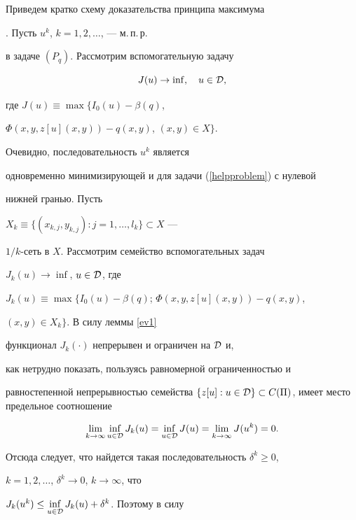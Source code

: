Приведем кратко схему доказательства принципа максимума


\cite{sumin1986}. Пусть $u^k$, $k=1,2,\dotsc$, --- м.\,п.\,р.


в задаче $(P_q)$. Рассмотрим вспомогательную задачу


\begin{equation}\label{helpproblem}


J(u)\to\inf,\quad  u\in{\cal D},


\end{equation}


где $J(u)\equiv\max\{I_0(u)-\beta(q)$,  


$\Phi(x, y, z[u](x, y))-q(x, y)$, $(x, y)\in X\}$.


Очевидно, последовательность $u^k$ является


одновременно минимизирующей и для задачи (\ref{helpproblem}) с нулевой


нижней гранью. Пусть


$X_k\equiv\{(x_{k, j}, y_{k, j}) : j=1,\dotsc,l_k\}\subset X$ ---


$1/k$-сеть в $X$. Рассмотрим семейство вспомогательных задач


$J_k(u)\to\inf$,  $u\in {\cal D}$, где


$J_k(u)\equiv\max\{I_0(u)-\beta(q)$;  $\Phi(x, y, z[u](x, y))-q(x, y)$,  


$(x, y)\in X_k\}$. В силу леммы \ref{ev1}


функционал $J_k(\cdot)$ непрерывен и ограничен на ${\cal D}$ и,


как нетрудно показать, пользуясь равномерной ограниченностью и


равностепенной непрерывностью семейства $\{z[u] : u\in {\cal D}\}\subset


C(\Pi)$, имеет место предельное соотношение


$$


\lim\limits_{k\to\infty}\inf\limits_{u\in {\cal D}}J_k(u)= \inf\limits_{u\in


{\cal D}}J(u)=\lim\limits_{k\to\infty}J(u^k)=0.


$$





Отсюда следует, что найдется такая последовательность ${\delta^k\geq 0}$,


$k=1,2,\dotsc$, $\delta^k\to 0$, $k\to\infty$, что


$J_k(u^k)\leq\inf\limits_{u\in {\cal D}}J_k(u)+\delta^k$. Поэтому в силу


